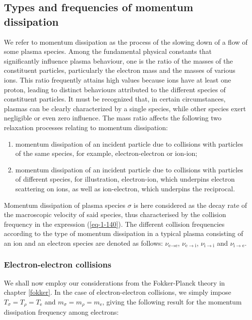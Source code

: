 \subsection{Types and frequencies of momentum dissipation}

We refer to momentum dissipation as the process of the slowing down of a flow of some plasma species. Among the fundamental physical constants that significantly influence plasma behaviour, one is the ratio of the masses of the constituent particles, particularly the electron mass and the masses of various ions. This ratio frequently attains high values because ions have at least one proton, leading to distinct behaviours attributed to the different species of constituent particles. It must be recognized that, in certain circumstances, plasmas can be clearly characterized by a single species, while other species exert negligible or even zero influence. The mass ratio affects the following two relaxation processes relating to momentum dissipation:

\begin{enumerate}
    \item momentum dissipation of an incident particle due to collisions with particles of the same species, for example, electron-electron or ion-ion;
    \item momentum dissipation of an incident particle due to collisions with particles of different species, for illustration, electron-ion, which underpins electron scattering on ions, as well as ion-electron, which underpins the reciprocal.
\end{enumerate}

Momentum dissipation of plasma species $\sigma$ is here considered as the decay rate of the macroscopic velocity of said species, thus characterised by the collision frequency in the expression (\ref{eq-1-140}). The different collision frequencies according to the type of momentum dissipation in a typical plasma consisting of an ion and an electron species are denoted as follows: $\nu_{\text{e}\to\text{e}}$, $\nu_{\text{e}\to\mathrm{i}}$, $\nu_{\mathrm{i}\to\mathrm{i}}$ and $\nu_{\mathrm{i}\to\text{e}}$.

\subsubsection{Electron-electron collisions}

We shall now employ our considerations from the Fokker-Planck theory in chapter \ref{fokker}. In the case of electron-electron collisions, we simply impose $T_\sigma=T_\rho=T_\text{e}$ and $m_\sigma=m_\rho=m_\text{e}$, giving the following result for the momentum dissipation frequency among electrons:

